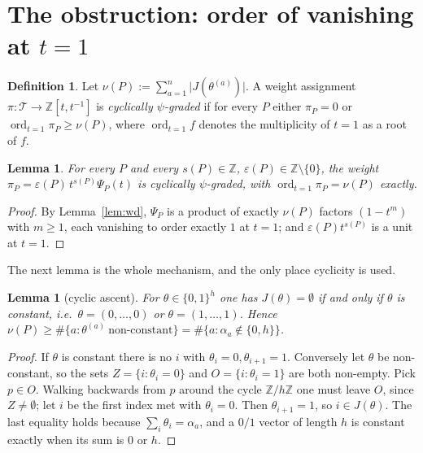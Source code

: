 \documentclass[11pt]{article}
\newtheorem{lemma}[theorem]{Lemma}
\theoremstyle{definition}
\newtheorem{definition}[theorem]{Definition}
\DeclareMathOperator{\ord}{ord}
\newcommand{\Z}{\mathbb{Z}}
\newcommand{\T}{\mathcal{T}}
\begin{document}
\section{The obstruction: order of vanishing at $t=1$}

\begin{definition}\label{def:psitype}
Let $\nu(P):=\sum_{a=1}^{n}\bigl|J(\theta^{(a)})\bigr|$. A weight assignment
$\pi:\T\to\Z[t,t^{-1}]$ is \emph{cyclically $\psi$-graded} if for every $P$
either $\pi_P=0$ or $\ord_{t=1}\pi_P\ge\nu(P)$, where $\ord_{t=1}f$ denotes the
multiplicity of $t=1$ as a root of $f$.
\end{definition}

\begin{lemma}\label{lem:kor-is-psi}
For every $P$ and every $s(P)\in\Z$, $\varepsilon(P)\in\Z\setminus\{0\}$, the
weight $\pi_P=\varepsilon(P)\,t^{s(P)}\Psi_P(t)$ is cyclically $\psi$-graded,
with $\ord_{t=1}\pi_P=\nu(P)$ exactly.
\end{lemma}

\begin{proof}
By Lemma~\ref{lem:wd}, $\Psi_P$ is a product of exactly $\nu(P)$ factors
$(1-t^{m})$ with $m\ge1$, each vanishing to order exactly $1$ at $t=1$; and
$\varepsilon(P)t^{s(P)}$ is a unit at $t=1$.
\end{proof}

The next lemma is the whole mechanism, and the only place cyclicity is used.

\begin{lemma}[cyclic ascent]\label{lem:ascent}
For $\theta\in\{0,1\}^{h}$ one has $J(\theta)=\emptyset$ if and only if
$\theta$ is constant, i.e.\ $\theta=(0,\dots,0)$ or $\theta=(1,\dots,1)$.
Hence $\nu(P)\ge\#\{a:\theta^{(a)}\ \text{non-constant}\}
=\#\{a:\alpha_a\notin\{0,h\}\}$.
\end{lemma}

\begin{proof}
If $\theta$ is constant there is no $i$ with $\theta_i=0,\theta_{i+1}=1$.
Conversely let $\theta$ be non-constant, so the sets
$Z=\{i:\theta_i=0\}$ and $O=\{i:\theta_i=1\}$ are both non-empty. Pick
$p\in O$. Walking backwards from $p$ around the cycle $\Z/h\Z$ one must leave
$O$, since $Z\ne\emptyset$; let $i$ be the first index met with
$\theta_i=0$. Then $\theta_{i+1}=1$, so $i\in J(\theta)$. The last equality
holds because $\sum_i\theta_i=\alpha_a$, and a $0/1$ vector of length $h$ is
constant exactly when its sum is $0$ or $h$.
\end{proof}
\end{document}
